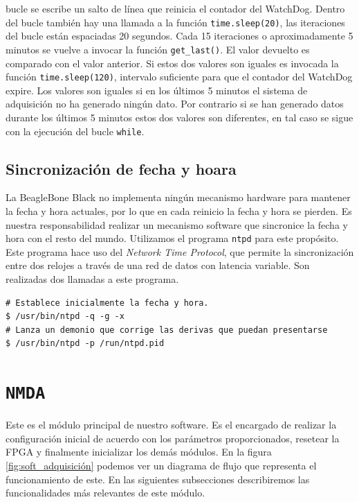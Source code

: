 		bucle se escribe un salto de línea que reinicia el contador del WatchDog. Dentro del bucle también hay una llamada a la función
		\texttt{time.sleep(20)}, las iteraciones del bucle están espaciadas 20 segundos. Cada 15 iteraciones o aproximadamente 5 minutos se
		vuelve a invocar la función \texttt{get\_last()}. El valor devuelto es comparado con el valor anterior. Si estos dos valores son
		iguales es invocada la función \texttt{time.sleep(120)}, intervalo suficiente para que el contador del WatchDog expire. Los valores
		son iguales si en los últimos 5 minutos el sistema de adquisición no ha generado ningún dato. Por contrario si se han generado datos
		durante los últimos 5 minutos estos dos valores son diferentes, en tal caso se sigue con la ejecución del bucle \texttt{while}. 
	\subsection{Sincronización de fecha y hoara}
		La BeagleBone Black no implementa ningún mecanismo hardware para mantener la fecha y hora actuales, por lo que en cada reinicio la
		fecha y hora se pierden. Es nuestra responsabilidad realizar un mecanismo software que sincronice la fecha y hora con el resto del
		mundo\cite{ntpd}. Utilizamos el programa \texttt{ntpd} para este propósito. Este programa hace uso del \emph{Network Time
		Protocol}\cite{ntpWiki}, que permite la sincronización entre dos relojes a través de una red de datos con latencia variable. Son
		realizadas dos llamadas a este programa.
		\begin{lstlisting}[style=myBash]
# Establece inicialmente la fecha y hora.
$ /usr/bin/ntpd -q -g -x
# Lanza un demonio que corrige las derivas que puedan presentarse
$ /usr/bin/ntpd -p /run/ntpd.pid
		\end{lstlisting}

\section{\texttt{NMDA}}
	Este es el módulo principal de nuestro software. Es el encargado de realizar la configuración inicial de acuerdo con los parámetros
	proporcionados, resetear la FPGA y finalmente inicializar los demás módulos. En la figura \ref{fig:soft_adquisición} podemos ver un diagrama
	de flujo que representa el funcionamiento de este. En las siguientes subsecciones describiremos las funcionalidades más relevantes de este
	módulo.
